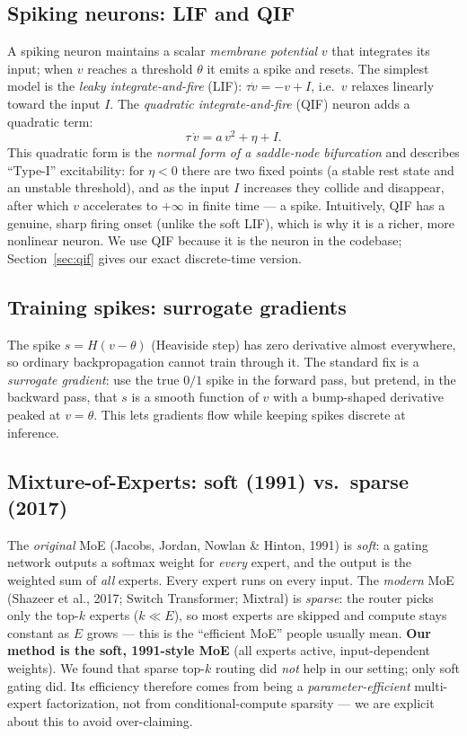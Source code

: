 \documentclass[11pt]{article}
\begin{document}
\subsection{Spiking neurons: LIF and QIF}
A spiking neuron maintains a scalar \emph{membrane potential} $v$ that integrates its input; when $v$
reaches a threshold $\theta$ it emits a spike and resets. The simplest model is the \emph{leaky
integrate-and-fire} (LIF): $\tau \dot v = -v + I$, i.e.\ $v$ relaxes linearly toward the input $I$.
The \emph{quadratic integrate-and-fire} (QIF) neuron adds a quadratic term:
\begin{equation}\label{eq:qif-ode}
\tau\,\dot v = a\,v^2 + \eta + I .
\end{equation}
This quadratic form is the \emph{normal form of a saddle-node bifurcation} and describes ``Type-I''
excitability: for $\eta<0$ there are two fixed points (a stable rest state and an unstable
threshold), and as the input $I$ increases they collide and disappear, after which $v$ accelerates to
$+\infty$ in finite time --- a spike. Intuitively, QIF has a genuine, sharp firing onset (unlike the
soft LIF), which is why it is a richer, more nonlinear neuron. We use QIF because it is the neuron in
the codebase; Section~\ref{sec:qif} gives our exact discrete-time version.

\subsection{Training spikes: surrogate gradients}
The spike $s = H(v-\theta)$ (Heaviside step) has zero derivative almost everywhere, so ordinary
backpropagation cannot train through it. The standard fix is a \emph{surrogate gradient}: use the
true $0/1$ spike in the forward pass, but pretend, in the backward pass, that $s$ is a smooth
function of $v$ with a bump-shaped derivative peaked at $v=\theta$. This lets gradients flow while
keeping spikes discrete at inference.

\subsection{Mixture-of-Experts: soft (1991) vs.\ sparse (2017)}
The \emph{original} MoE (Jacobs, Jordan, Nowlan \& Hinton, 1991) is \emph{soft}: a gating network
outputs a softmax weight for \emph{every} expert, and the output is the weighted sum of \emph{all}
experts. Every expert runs on every input. The \emph{modern} MoE (Shazeer et al., 2017; Switch
Transformer; Mixtral) is \emph{sparse}: the router picks only the top-$k$ experts ($k\ll E$), so most
experts are skipped and compute stays constant as $E$ grows --- this is the ``efficient MoE'' people
usually mean. \textbf{Our method is the soft, 1991-style MoE} (all experts active, input-dependent
weights). We found that sparse top-$k$ routing did \emph{not} help in our setting; only soft gating
did. Its efficiency therefore comes from being a \emph{parameter-efficient} multi-expert factorization,
not from conditional-compute sparsity --- we are explicit about this to avoid over-claiming.
\end{document}
